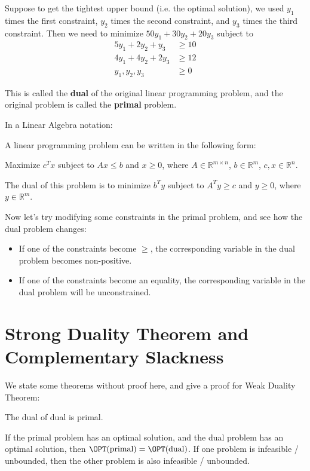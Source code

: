 Suppose to get the tightest upper bound (i.e. the optimal solution), we used $y_1$ times the first constraint, $y_2$ times the second constraint, and $y_3$ times the third constraint. Then we need to minimize $50 y_1 + 30 y_2 + 20 y_3$ subject to
\begin{align*}
	5 y_1 + 2 y_2 + y_3   & \geq 10 \\
	4 y_1 + 4 y_2 + 2 y_3 & \geq 12 \\
	y_1, y_2, y_3         & \geq 0
\end{align*}

This is called the \textbf{dual} of the original linear programming problem, and the original problem is called the \textbf{primal} problem.

In a Linear Algebra notation:
\begin{definition}
	A linear programming problem can be written in the following form:

	Maximize $c^T x$ subject to $A x \leq b$ and $x \geq 0$, where $A\in \mathbb{R}^{m \times n}$, $b \in \mathbb{R}^m$, $c, x \in \mathbb{R}^n$.

	The dual of this problem is to minimize $b^T y$ subject to $A^T y \geq c$ and $y \geq 0$, where $y\in \mathbb{R}^m$.
\end{definition}

Now let's try modifying some constraints in the primal problem, and see how the dual problem changes:

\begin{itemize}
	\item If one of the constraints become $\geq$, the corresponding variable in the dual problem becomes non-positive.
	\item If one of the constraints become an equality, the corresponding variable in the dual problem will be unconstrained.
\end{itemize}

\section{Strong Duality Theorem and Complementary Slackness}

We state some theorems without proof here, and give a proof for Weak Duality Theorem:

\begin{theorem}
	The dual of dual is primal.
\end{theorem}

\begin{theorem}
	If the primal problem has an optimal solution, and the dual problem has an optimal solution, then $\OPT(\text{primal}) = \OPT(\text{dual})$.
	If one problem is infeasible / unbounded, then the other problem is also infeasible / unbounded.
\end{theorem}

